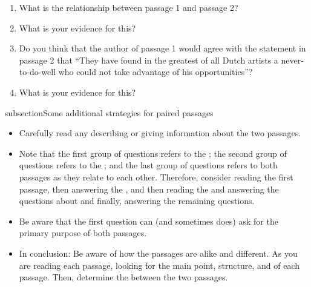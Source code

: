 \begin{enumerate}
\begin{itemize}
\item   

 \end{itemize} 

\item What is the relationship between passage 1 and passage 2? \hrulefill

\item What is your evidence for this? \hrulefill

\item Do you think that the author of passage 1 would agree with the statement in passage 2 that ``They have found in the greatest of all Dutch artists a never-to-do-well who could not take advantage of his opportunities''? \hrulefill

\item What is your evidence for this? \hrulefill

\end{enumerate}

subsection{Some additional strategies for paired passages}

\begin{itemize}

\item Carefully read any \longline describing or giving information about the two passages.

\item Note that the first group of questions refers to the \longline; the second group of questions refers to the \longline; and the last group of questions refers to both passages as they relate to each other. Therefore, consider reading the first passage, then answering the \longline, and then reading the \longline and answering the questions about \longline and finally, answering the remaining questions.

\item Be aware that the first question can (and sometimes does) ask for the primary purpose of both passages.

\item In conclusion: Be aware of how the passages are alike and different. As you are reading each passage, looking for the main point, structure, and \longline of each passage. Then, determine the \longline between the two passages. 

\end{itemize}
